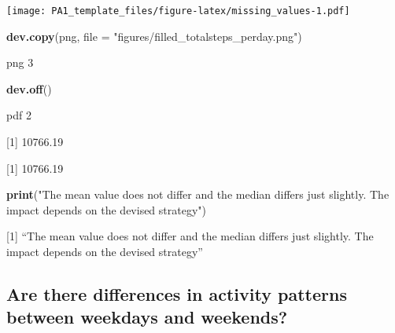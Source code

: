 \documentclass[
]{article}
\newenvironment{Shaded}{\begin{snugshade}}{\end{snugshade}}
\newcommand{\DataTypeTok}[1]{\textcolor[rgb]{0.13,0.29,0.53}{#1}}
\newcommand{\KeywordTok}[1]{\textcolor[rgb]{0.13,0.29,0.53}{\textbf{#1}}}
\newcommand{\NormalTok}[1]{#1}
\newcommand{\OperatorTok}[1]{\textcolor[rgb]{0.81,0.36,0.00}{\textbf{#1}}}
\newcommand{\StringTok}[1]{\textcolor[rgb]{0.31,0.60,0.02}{#1}}
\begin{document}
\texttt{[image: PA1\_template\_files/figure-latex/missing\_values-1.pdf]}

\begin{Shaded}
\begin{Highlighting}[]
\KeywordTok{dev.copy}\NormalTok{(png, }\DataTypeTok{file =} \StringTok{"figures/filled_totalsteps_perday.png"}\NormalTok{)}
\end{Highlighting}
\end{Shaded}

png 3

\begin{Shaded}
\begin{Highlighting}[]
\KeywordTok{dev.off}\NormalTok{()}
\end{Highlighting}
\end{Shaded}

pdf 2

\begin{Shaded}
\end{Shaded}

{[}1{]} 10766.19

\begin{Shaded}
\end{Shaded}

{[}1{]} 10766.19

\begin{Shaded}
\begin{Highlighting}[]
\KeywordTok{print}\NormalTok{(}\StringTok{"The mean value does not differ and the median differs just slightly. The impact depends on the devised strategy"}\NormalTok{)}
\end{Highlighting}
\end{Shaded}

{[}1{]} ``The mean value does not differ and the median differs just
slightly. The impact depends on the devised strategy''

\hypertarget{are-there-differences-in-activity-patterns-between-weekdays-and-weekends}{%
\subsection{Are there differences in activity patterns between weekdays
and
weekends?}\label{are-there-differences-in-activity-patterns-between-weekdays-and-weekends}}
\end{document}
